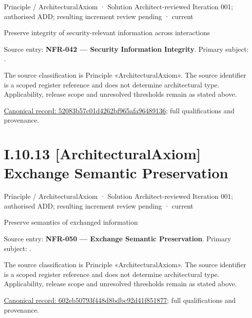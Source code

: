 \label{element:52083b57c01d4262bf965afa96489136}
{\small Principle / ArchitecturalAxiom · Solution Architect-reviewed Iteration 001; authorised ADD; resulting increment review pending · current}\par

Preserve integrity of security-relevant information across interactions



Source entry: \textbf{NFR-042 — Security Information Integrity}. Primary subject: \texttt{}.



The source classification is Principle «ArchitecturalAxiom». The source identifier is a scoped register reference and does not determine architectural type. Applicability, release scope and unresolved thresholds remain as stated above.


{\footnotesize \href{../../../../../../../continuum/motivation/principle/architectural-axiom/52083b57c01d4262bf965afa96489136.md}{Canonical record: 52083b57c01d4262bf965afa96489136}; full qualifications and provenance.}\par
\section*{I.10.13 [ArchitecturalAxiom] Exchange Semantic Preservation}
\label{navigation:I.10.13}

\label{element:602eb50793f448d8bdbc92d41f851877}
{\small Principle / ArchitecturalAxiom · Solution Architect-reviewed Iteration 001; authorised ADD; resulting increment review pending · current}\par

Preserve semantics of exchanged information



Source entry: \textbf{NFR-050 — Exchange Semantic Preservation}. Primary subject: \texttt{}.



The source classification is Principle «ArchitecturalAxiom». The source identifier is a scoped register reference and does not determine architectural type. Applicability, release scope and unresolved thresholds remain as stated above.


{\footnotesize \href{../../../../../../../continuum/motivation/principle/architectural-axiom/602eb50793f448d8bdbc92d41f851877.md}{Canonical record: 602eb50793f448d8bdbc92d41f851877}; full qualifications and provenance.}\par
